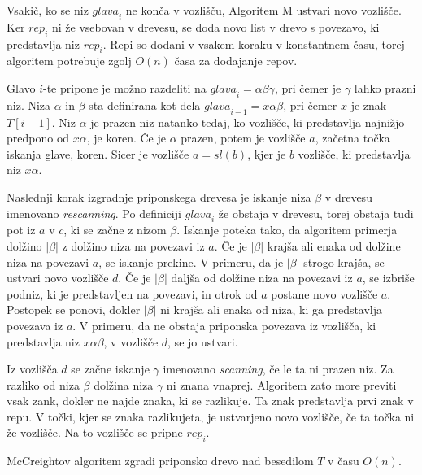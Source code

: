 Vsakič, ko se niz $\textit{glava}_i$ ne konča v vozlišču, Algoritem M ustvari novo vozlišče. Ker $\textit{rep}_i$ ni že vsebovan v drevesu, se doda novo list v drevo s povezavo, ki predstavlja niz $\textit{rep}_i$. Repi so dodani v vsakem koraku v konstantnem času, torej algoritem potrebuje zgolj $O(n)$ časa za dodajanje repov.

Glavo $i$-te pripone je možno razdeliti na $\textit{glava}_i = \alpha\beta\gamma$, pri čemer je $\gamma$ lahko prazni niz. Niza $\alpha$ in $ \beta$ sta definirana kot dela $\textit{glava}_{i-1} = x\alpha\beta$, pri čemer $x$ je znak $T[i-1]$. Niz $\alpha$ je prazen niz natanko tedaj, ko vozlišče, ki predstavlja najnižjo predpono od $x\alpha$, je koren. Če je $\alpha$ prazen, potem je vozlišče $a$, začetna točka iskanja glave, koren. Sicer je vozlišče $a=\textit{sl}(b)$, kjer je $b$ vozlišče, ki predstavlja niz $x\alpha$.

Naslednji korak izgradnje priponskega drevesa je iskanje niza $\beta$ v drevesu imenovano \textit{rescanning}. Po definiciji $\textit{glava}_i$ že obstaja v drevesu, torej obstaja tudi pot iz $a$ v $c$, ki se začne z nizom $\beta$. Iskanje poteka tako, da algoritem primerja dolžino $|\beta|$ z dolžino niza na povezavi iz $a$. Če je $|\beta|$ krajša ali enaka od dolžine niza na povezavi $a$, se iskanje prekine. V primeru, da je $|\beta|$ strogo krajša, se ustvari novo vozlišče $d$. Če je $|\beta|$ daljša od dolžine niza na povezavi iz $a$, se izbriše podniz, ki je predstavljen na povezavi, in otrok od $a$ postane novo vozlišče $a$. Postopek se ponovi, dokler $|\beta|$ ni krajša ali enaka od niza, ki ga predstavlja povezava iz $a$. V primeru, da ne obstaja priponska povezava iz vozlišča, ki predstavlja niz $x\alpha\beta$, v vozlišče $d$, se jo ustvari.

Iz vozlišča $d$ se začne iskanje $\gamma$ imenovano \textit{scanning}, če le ta ni prazen niz. Za razliko od niza $\beta$ dolžina niza $\gamma$ ni znana vnaprej. Algoritem zato more previti vsak zank, dokler ne najde znaka, ki se razlikuje. Ta znak predstavlja prvi znak v repu. V točki, kjer se znaka razlikujeta, je ustvarjeno novo vozlišče, če ta točka ni že vozlišče. Na to vozlišče se pripne $\textit{rep}_i$.


\begin{izr}
    McCreightov algoritem zgradi priponsko drevo nad besedilom $T$ v času $O(n)$.
\end{izr}


